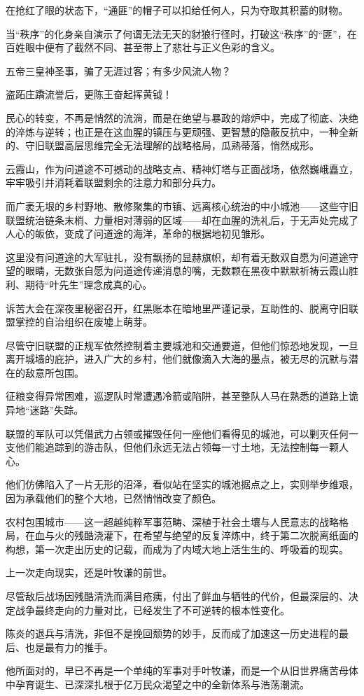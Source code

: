 在抢红了眼的状态下，“通匪”的帽子可以扣给任何人，只为夺取其积蓄的财物。

当“秩序”的化身亲自演示了何谓无法无天的豺狼行径时，打破这“秩序”的“匪”，在百姓眼中便有了截然不同、甚至带上了悲壮与正义色彩的含义。

五帝三皇神圣事，骗了无涯过客；有多少风流人物？

盗跖庄蹻流誉后，更陈王奋起挥黄钺！

\vspace{2em}

民心的转变，不再是悄然的流淌，而是在绝望与暴政的熔炉中，完成了彻底、决绝的淬炼与逆转；也正是在这血腥的镇压与更顽强、更智慧的隐蔽反抗中，一种全新的、守旧联盟高层思维完全无法理解的战略格局，瓜熟蒂落，悄然成形。

云霞山，作为问道途不可撼动的战略支点、精神灯塔与正面战场，依然巍峨矗立，牢牢吸引并消耗着联盟剩余的注意力和部分兵力。

而广袤无垠的乡村野地、散修聚集的市镇、远离核心统治的中小城池——这些守旧联盟统治链条末梢、力量相对薄弱的区域——却在血腥的洗礼后，于无声处完成了人心的皈依，变成了问道途的海洋，革命的根据地初见雏形。

这里没有问道途的大军驻扎，没有飘扬的显赫旗帜，却有着无数双自愿为问道途守望的眼睛，无数张自愿为问道途传递消息的嘴，无数颗在黑夜中默默祈祷云霞山胜利、期待“叶先生”理念成真的心。

诉苦大会在深夜里秘密召开，红黑账本在暗地里严谨记录，互助性的、脱离守旧联盟掌控的自治组织在废墟上萌芽。

尽管守旧联盟的正规军依然控制着主要城池和交通要道，但他们惊恐地发现，一旦离开城墙的庇护，进入广大的乡村，他们就像滴入大海的墨点，被无尽的沉默与潜在的敌意所包围。

征粮变得异常困难，巡逻队时常遭遇冷箭或陷阱，甚至整队人马在熟悉的道路上诡异地“迷路”失踪。

联盟的军队可以凭借武力占领或摧毁任何一座他们看得见的城池，可以剿灭任何一支他们能追踪到的游击队，但他们永远无法占领每一寸土地，无法控制每一颗人心。

他们仿佛陷入了一片无形的沼泽，看似站在坚实的城池据点之上，实则举步维艰，因为承载他们的整个大地，已然悄悄改变了颜色。

农村包围城市——这一超越纯粹军事范畴、深植于社会土壤与人民意志的战略格局，在血与火的残酷浇灌下，在希望与绝望的反复淬炼中，终于第二次脱离纸面的构想，第一次走出历史的记载，而成为了内域大地上活生生的、呼吸着的现实。

上一次走向现实，还是叶牧谦的前世。

尽管敌后战场因残酷清洗而满目疮痍，付出了鲜血与牺牲的代价，但最深层的、决定战争最终走向的力量对比，已经发生了不可逆转的根本性变化。

陈炎的退兵与清洗，非但不是挽回颓势的妙手，反而成了加速这一历史进程的最后、也是最有力的推手。

他所面对的，早已不再是一个单纯的军事对手叶牧谦，而是一个从旧世界痛苦母体中孕育诞生、已深深扎根于亿万民众渴望之中的全新体系与浩荡潮流。

